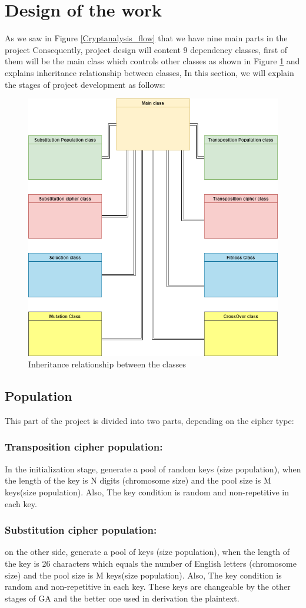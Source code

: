 \section{Design of the work}
As we saw in Figure \ref{Cryptanalysis_flow} that we have nine main parts in the project Consequently, project design will content 9 dependency classes, first of them will be the main class which controls other classes as shown in Figure \ref{classes} and explains inheritance relationship between classes, In this section, we will explain the stages of project development as follows:
\newpage
\clearpage
\begin{figure}[h]
	\centering
	\includegraphics[width=.8\textwidth]{imagenes/classes.png}
    \caption{Inheritance relationship between the classes}
    \label{classes}
\end{figure}
\subsection{Population}
This part of the project is divided into two parts, depending on the cipher type:
\subsubsection{Transposition cipher population:}
In the initialization stage, generate a pool of random keys (size population), when the length of the key is N digits (chromosome size) and the pool size is M keys(size population). Also, The key condition is random and non-repetitive in each key. 
\subsubsection{Substitution  cipher population:}
on the other side, generate a pool of keys (size population), when the length of the key is 26 characters which equals the number of English letters (chromosome size) and the pool size is M keys(size population). Also, The key condition is random and non-repetitive in each key. These keys are changeable by the other stages of GA and the better one used in derivation the plaintext.
